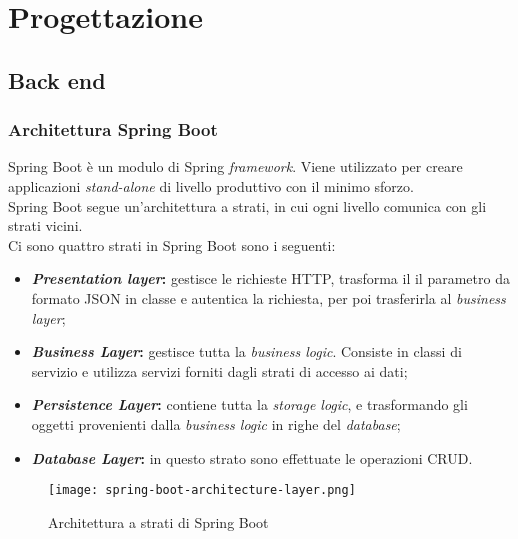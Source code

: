 \section{Progettazione}
\label{sec:progettazione}

\subsection{Back end}
\subsubsection{Architettura Spring Boot}
Spring Boot è un modulo di Spring \textit{framework}. Viene utilizzato per creare applicazioni \textit{stand-alone} di livello produttivo con il minimo sforzo.\\
Spring Boot segue un'architettura a strati, in cui ogni livello comunica con gli strati vicini.\\
Ci sono quattro strati in Spring Boot sono i seguenti:
\begin{itemize}
    \item \textbf{\textit{Presentation layer}:} gestisce le richieste HTTP, trasforma il il parametro da formato JSON in classe e autentica la richiesta, per poi trasferirla al \textit{business layer};
    \item \textbf{\textit{Business Layer}:} gestisce tutta la \textit{business logic}. Consiste in classi di servizio e utilizza servizi forniti dagli strati di accesso ai dati;
    \item \textbf{\textit{Persistence Layer}:} contiene tutta la \textit{storage logic}, e trasformando gli oggetti provenienti dalla \textit{business logic} in righe del \textit{database};
    \item \textbf{\textit{Database Layer}:} in questo strato sono effettuate le operazioni \gls{CRUD}.
\end{itemize}
\begin{figure}[H] 
    \centering 
    \texttt{[image: spring-boot-architecture-layer.png]} 
    \caption{Architettura a strati di Spring Boot}
\end{figure}

